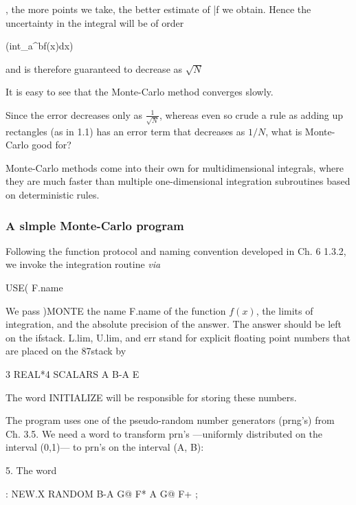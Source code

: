 \ie, the more points we take, the better estimate of \bar{f} we obtain. Hence the uncertainty in the integral will be of order

\Delta (int_{a}^{b}f(x)dx) \approx {}

and is therefore guaranteed to decrease as $\sqrt{N}$

It is easy to see that the Monte-Carlo method converges slowly.

Since the error decreases only as $\frac{1}{\sqrt{N}}$, whereas even so crude a rule as adding up rectangles (as in 1.1) has an error term that decreases as $1/N$, what is Monte-Carlo good for?

Monte-Carlo methods come into their own for multidimensional integrals, where they are much faster than multiple one-dimensional integration subroutines based on deterministic rules.

\subsubsection{A slmple Monte-Carlo program}
Following the function protocol and naming convention developed in Ch. 6 1.3.2, we invoke the integration routine \textit{via}

USE( F.name %

We pass )MONTE the name F.name of the function $f(x)$, the limits of integration, and the absolute precision of the answer. The answer should be left on the ifstack. L.lim, U.lim, and err stand for explicit floating point numbers that are placed on the 87stack by %

3 REAL*4 SCALARS A B-A E

The word INITIALIZE will be responsible for storing these numbers.

The program uses one of the pseudo-random number generators (prng’s) from Ch. 3.5. We need a word to transform prn's —uniformly distributed on the interval (0,1)— to prn's on the interval (A, B):

5. The word %

: NEW.X RANDOM B-A G@ F* A G@ F+ ;

